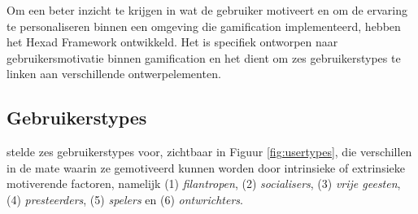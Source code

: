 Om een beter inzicht te krijgen in wat de gebruiker motiveert en om de ervaring te personaliseren binnen een omgeving die gamification implementeerd, hebben \textcite{Tondello2016} het Hexad Framework ontwikkeld. Het is specifiek ontworpen naar gebruikersmotivatie binnen gamification en het dient om zes gebruikerstypes te linken aan verschillende ontwerpelementen.

\subsection{Gebruikerstypes}

\textcite{Marczewski2015} stelde zes gebruikerstypes voor, zichtbaar in Figuur \ref{fig:usertypes}, die verschillen in de mate waarin ze gemotiveerd kunnen worden door intrinsieke of extrinsieke motiverende factoren, namelijk (1) \textit{filantropen}, (2) \textit{socialisers}, (3) \textit{vrije geesten}, (4) \textit{presteerders}, (5) \textit{spelers} en (6) \textit{ontwrichters}.

